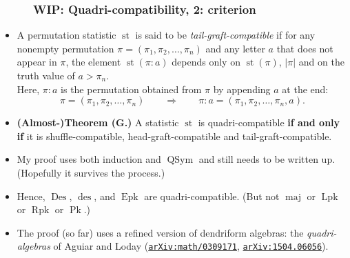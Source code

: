 \documentclass{beamer}
\newcommand{\red}{\color{red}}
\newcommand{\Lpk}{\operatorname{Lpk}}
\newcommand{\Rpk}{\operatorname{Rpk}}
\newcommand{\Pk}{\operatorname{Pk}}
\newcommand{\Epk}{\operatorname{Epk}}
\newcommand{\Des}{\operatorname{Des}}
\newcommand{\des}{\operatorname{des}}
\newcommand{\maj}{\operatorname{maj}}
\newcommand{\st}{\operatorname{st}}
\newcommand{\QSym}{\operatorname{QSym}}
\newcommand\arxiv[1]{\href{http://www.arxiv.org/abs/#1}{\texttt{arXiv:#1}}}
\newcommand{\fti}[1]{\frametitle{\ \ \ \ \ #1}}
\newcommand{\tup}[1]{\left( #1 \right)}
\newcommand{\defn}[1]{{\color{darkred}\emph{#1}}} %
\theoremstyle{plain}
\begin{document}
\begin{frame}
\fti{WIP: Quadri-compatibility, 2: criterion}

\begin{itemize}

\item A permutation statistic $\st$ is said to be
      \defn{tail-graft-compatible} if for any nonempty permutation
      $\pi = \tup{\pi_1, \pi_2, \ldots, \pi_n}$ and any
      letter $a$ that does not appear in $\pi$, the element
      $\operatorname*{st} \left( \pi : a \right)  $
      depends only on $\operatorname*{st}\left(  \pi\right)$,
      $\left\vert \pi\right\vert $ and on the truth value of $a > \pi_n$. \\
      Here,
      $\pi : a$ is the permutation obtained from $\pi$ by appending $a$ at the end:
      \[
      \pi = \tup{\pi_1, \pi_2, \ldots, \pi_n} \qquad \Longrightarrow \qquad
      \pi : a = \tup{\pi_1, \pi_2, \ldots, \pi_n, a} .
      \]
      
\pause
\item \textbf{(Almost-)Theorem (G.)}
      A statistic $\st$ is quadri-compatible \textbf{if and only if}
      it is shuffle-compatible, head-graft-compatible
      and tail-graft-compatible.

\item My proof uses both induction and $\QSym$ and still needs to be
      written up. (Hopefully it survives the process.)

\pause
\item Hence, $\Des$, $\des$, and $\Epk$ are
      quadri-compatible. \pause
      (But not $\maj$ or $\Lpk$ or $\Rpk$ or $\Pk$.)
\pause

\item The proof (so far) uses a refined version of dendriform algebras:
      the \emph{quadri-algebras} of Aguiar and Loday
      ({\red \arxiv{math/0309171}}, {\red \arxiv{1504.06056}}).

\end{itemize}
\vspace{10cm}

\end{frame}





      
\end{document}
